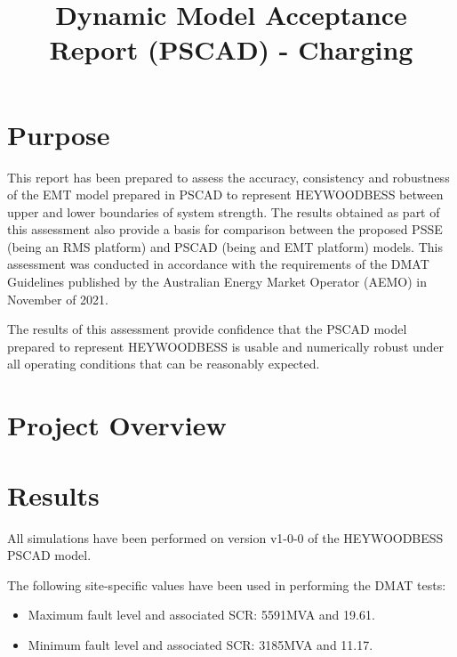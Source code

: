 \documentclass{../grid-link-report}
\title{Dynamic Model Acceptance Report (PSCAD) - Charging}
\newcommand{\projectassetsdir}{../project-assets}
\begin{document}
	\adddraftstamp
	\listoftodos
	
	\frontmatter
	\maketitle
	
	\makedisclaimer
	\clearpage
	\tableofcontents
	\makerevisionhistorypage
	
	\mainmatter
	
	
	\chapter{Purpose}
	This report has been prepared to assess the accuracy, consistency and robustness of the \ac{EMT} model prepared in PSCAD to represent \ac{HEYWOODBESS} between upper and lower boundaries of system strength. The results obtained as part of this assessment also provide a basis for comparison between the proposed PSSE (being an \ac{RMS} platform) and PSCAD (being and \ac{EMT} platform) models. This assessment was conducted in accordance with the requirements of the \ac{DMAT} Guidelines published by the Australian Energy Market Operator (AEMO) in November of 2021\cite{dmat-nov-2021}.
	
	The results of this assessment provide confidence that the PSCAD model prepared to represent \ac{HEYWOODBESS} is usable and numerically robust under all operating conditions that can be reasonably expected.
	
	
	\chapter{Project Overview}
	
	
	\chapter{Results}
	
	All simulations have been performed on version v1-0-0 of the \ac{HEYWOODBESS} PSCAD model.
	
	The following site-specific values have been used in performing the \ac{DMAT} tests:
	
	\begin{itemize}
		\item Maximum fault level and associated \ac{SCR}: 5591MVA and 19.61\cite{connection-enquiry-response}.
		\item Minimum fault level and associated \ac{SCR}: 3185MVA and 11.17\cite{connection-enquiry-response}.
	\end{itemize}
	
\end{document}
